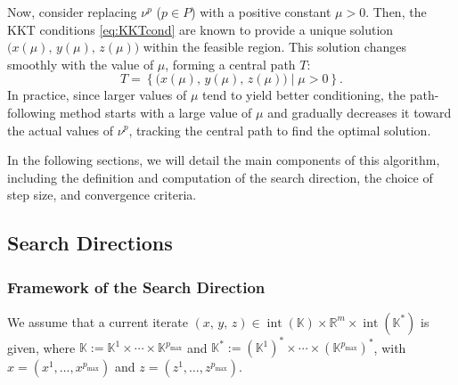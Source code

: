 Now, consider replacing $\nu^p$ ($p \in P$) with a positive constant $\mu > 0$. 
Then, the KKT conditions \eqref{eq:KKTcond} are known to provide a unique solution $\big( x(\mu),\, y(\mu),\, z(\mu) \big)$ within the feasible region. 
This solution changes smoothly with the value of $\mu$, forming a central path $T$:
\[
  T = \left\{ \big( x(\mu),\, y(\mu),\, z(\mu) \big) \mid \mu > 0 \right\}.
\]
In practice, since larger values of $\mu$ tend to yield better conditioning, the path-following method starts with a large value of $\mu$ and gradually decreases it toward the actual values of $\nu^p$, tracking the central path to find the optimal solution.

In the following sections, we will detail the main components of this algorithm, including the definition and computation of the search direction, the choice of step size, and convergence criteria.


\subsection{Search Directions} \label{sec:direction}
\subsubsection{Framework of the Search Direction}
We assume that a current iterate $(x,\,y,\,z) \in \operatorname{int}(\mathbb{K}) \times \mathbb{R}^m \times \operatorname{int}(\mathbb{K}^*)$ is given, where $\mathbb{K} := \mathbb{K}^1 \times \cdots \times \mathbb{K}^{p_{\max}}$ and $\mathbb{K}^* := (\mathbb{K}^1)^* \times \cdots \times (\mathbb{K}^{p_{\max}})^*$, with $x = (x^1, \ldots, x^{p_{\max}})$ and $z = (z^1, \ldots, z^{p_{\max}})$.

